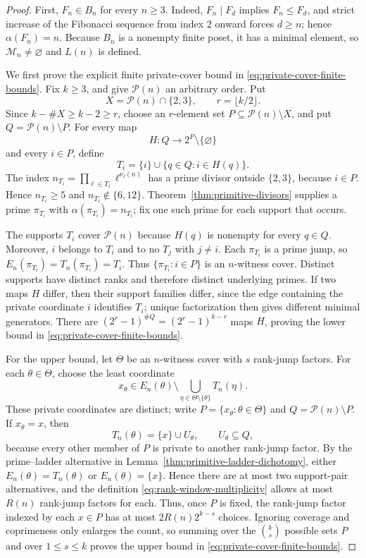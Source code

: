 \begin{proof}
First, $F_n\in B_n$ for every $n\ge3$.  Indeed,
$F_n\mid F_d$ implies $F_n\le F_d$, and strict increase of the Fibonacci
sequence from index $2$ onward forces $d\ge n$; hence $\alpha(F_n)=n$.
Because $B_n$ is a nonempty finite poset, it has a minimal element, so
$\mathcal M_n\ne\varnothing$ and $L(n)$ is defined.

We first prove the explicit finite private-cover bound in
\eqref{eq:private-cover-finite-bounds}. Fix $k\ge3$, and give
$\mathcal P(n)$ an arbitrary order. Put
\[
 X=\mathcal P(n)\cap\{2,3\},\qquad r=\lfloor k/2\rfloor.
\]
Since $k-\#X\ge k-2\ge r$, choose an $r$-element set
$P\subseteq\mathcal P(n)\setminus X$, and put
$Q=\mathcal P(n)\setminus P$. For every map
\[
 H:Q\longrightarrow 2^P\setminus\{\varnothing\}
\]
and every $i\in P$, define
\[
 T_i=\{i\}\cup\{q\in Q:i\in H(q)\}.
\]
The index $n_{T_i}=\prod_{\ell\in T_i}\ell^{\nu_\ell(n)}$ has a prime
divisor outside $\{2,3\}$, because $i\in P$. Hence $n_{T_i}\ge5$ and
$n_{T_i}\notin\{6,12\}$. Theorem~\ref{thm:primitive-divisors} supplies a
prime $\pi_{T_i}$ with $\alpha(\pi_{T_i})=n_{T_i}$; fix one such prime for
each support that occurs.

The supports $T_i$ cover $\mathcal P(n)$ because $H(q)$ is nonempty for every
$q\in Q$. Moreover, $i$ belongs to $T_i$ and to no $T_j$ with $j\ne i$.
Each $\pi_{T_i}$ is a prime jump, so
$E_n(\pi_{T_i})=T_n(\pi_{T_i})=T_i$. Thus
$\{\pi_{T_i}:i\in P\}$ is an $n$-witness cover. Distinct supports have
distinct ranks and therefore distinct underlying primes. If two maps $H$
differ, then their support families differ, since the edge containing the
private coordinate $i$ identifies $T_i$; unique factorization then gives
different minimal generators. There are
$(2^r-1)^{\#Q}=(2^r-1)^{k-r}$ maps $H$, proving the lower bound in
\eqref{eq:private-cover-finite-bounds}.

For the upper bound, let $\Theta$ be an $n$-witness cover with $s$ rank-jump factors. For
each $\theta\in\Theta$, choose the least coordinate
\[
 x_\theta\in E_n(\theta)\setminus
 \bigcup_{\eta\in\Theta\setminus\{\theta\}}T_n(\eta).
\]
These private coordinates are distinct; write
$P=\{x_\theta:\theta\in\Theta\}$ and
$Q=\mathcal P(n)\setminus P$. If $x_\theta=x$, then
\[
 T_n(\theta)=\{x\}\cup U_\theta,\qquad U_\theta\subseteq Q,
\]
because every other member of $P$ is private to another rank-jump factor. By the
prime--ladder alternative in Lemma~\ref{thm:primitive-ladder-dichotomy}, either
$E_n(\theta)=T_n(\theta)$ or $E_n(\theta)=\{x\}$. Hence there are at most two
support-pair alternatives, and the definition
\eqref{eq:rank-window-multiplicity} allows at most $R(n)$ rank-jump factors for each.
Thus, once $P$ is fixed, the rank-jump factor indexed by each
$x\in P$ has at most $2R(n)2^{k-s}$ choices. Ignoring coverage and
coprimeness only enlarges the count, so summing over the
$\binom{k}{s}$ possible sets $P$ and over $1\le s\le k$ proves the upper
bound in \eqref{eq:private-cover-finite-bounds}.


\end{proof}
